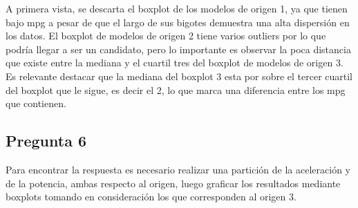 \documentclass[letter,10pt]{article}
\begin{document}
A primera vista, se descarta el boxplot de los modelos de origen 1, ya que tienen bajo mpg a pesar de que el largo de sus bigotes
demuestra una alta dispersión en los datos. El boxplot de modelos de origen 2  tiene varios outliers por lo que podría llegar a ser un
candidato, pero lo importante es observar la poca distancia que existe entre la mediana y el cuartil tres del boxplot de modelos de origen 3. Es relevante
destacar que la mediana del boxplot 3 esta por sobre el tercer cuartil del boxplot que le sigue, es decir el 2, lo que marca una diferencia entre los mpg que contienen.

\newpage
\subsection{Pregunta 6}

Para encontrar la respuesta es necesario realizar una partición de la aceleración y de la potencia, ambas respecto al origen, luego graficar los resultados
mediante boxplots tomando en consideración los que corresponden al origen 3.
\end{document}
